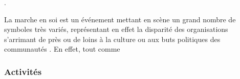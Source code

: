 .

La marche en soi est un événement mettant en scène un grand nombre de symboles très variés, représentant en effet la disparité des organisations s'arrimant de près ou de loins à la culture ou aux buts politiques des communautés \lgbt.
En effet, tout comme
\subsubsection{Activités}
\label{subsec:activitesfiertemontreal}




